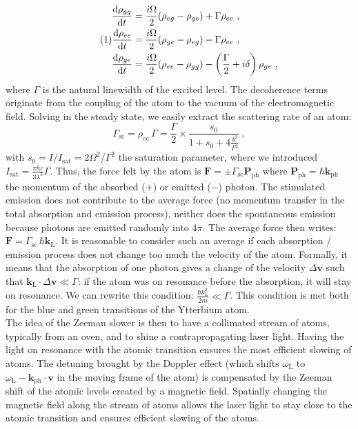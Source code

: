 \documentclass[11pt]{article}
\newcommand{\mathsc}[1]{\mathrm{\scriptscriptstyle {#1}}}
\numberwithin{equation}{section}
\numberwithin{figure}{section}
\begin{document}
\allowdisplaybreaks
\begin{align*}
    \dv{\rho_{gg}}{t} & =\frac{i \Omega}{2} (\rho_{eg} -\rho_{ge}) + \Gamma \rho_{ee} ~,\\  
     \stepcounter{equation}\tag{\theequation}\label{eq:OBE}
    \dv{\rho_{ee}}{t} & = \frac{i \Omega}{2} (\rho_{ge} -\rho_{eg}) -\Gamma \rho_{ee}~,\\
    \dv{\rho_{ge}}{t} & = \frac{i \Omega}{2} (\rho_{ee} -\rho_{gg}) -\left( \frac{\Gamma}{2} + i \delta \right) \rho_{ge}~,
\end{align*}
%
where $\Gamma$ is the natural linewidth of the excited level. The decoherence terms originate from the coupling of the atom to the vacuum of the electromagnetic field. Solving in the steady state, we easily extract the scattering rate of an atom:
%
\begin{equation}
	\label{eq:scattering}
	\Gamma_\text{sc} = \rho_{ee} \, \Gamma = \frac{\Gamma}{2} \times \frac{s_0}{1 + s_0 + 4 \frac{\delta ^2}{\Gamma ^2}} ~,
\end{equation}
%
with $s_0 = I/I_\text{sat} = 2 \Omega^2 / \Gamma^2$ the saturation parameter, where we introduced $I_\text{sat} = \frac{\pi h c}{3 \lambda^3} \Gamma$.  Thus, the force felt by the atom is $\mathbf{F} = \pm \Gamma_\text{sc} \mathbf{P}_\text{ph}$ where $\mathbf{P}_\text{ph} = \hbar \mathbf{k}_\text{ph}$ the momentum of the absorbed ($+$) or emitted ($-$) photon. The stimulated emission does not contribute to the average force (no momentum transfer in the total absorption and emission process), neither does the spontaneous emission because photons are emitted randomly into $4 \pi$. The average force then writes: $\mathbf{F} =  \Gamma_\text{sc} \, \hbar \mathbf{k}_\mathsc{L}$. It is reasonable to consider such an average if each absorption / emission process does not change too much the velocity of the atom. Formally, it means that the absorption of  one photon gives a change of the velocity $\Delta \mathbf{v}$ such that $\mathbf{k}_\mathsc{L} \cdot \Delta \mathbf{v} \ll \Gamma$: if the atom was on resonance before the absorption, it will stay on resonance. We can rewrite this condition: $\frac{\hbar k_\mathsc{L}^2}{2 m} \ll \Gamma$. This condition is met both for the blue and green transitions of the Ytterbium atom.\\

The idea of the Zeeman slower is then to have a collimated stream of atoms, typically from an oven, and to shine a contrapropagating laser light. Having the light on resonance with the atomic transition ensures the most efficient slowing of atoms. The detuning brought by the Doppler effect (which shifts $\omega_\mathsc{L}$ to $\omega_\mathsc{L} - \mathbf{k}_\text{ph} \cdot \mathbf{v}$ in the moving frame of the atom) is compensated by the Zeeman shift of the atomic levels created by a magnetic field. Spatially changing the magnetic field along the stream of atoms allows the laser light to stay close to the atomic transition and ensures efficient slowing of the atoms. 
\end{document}
